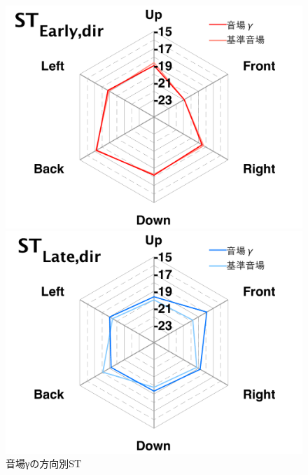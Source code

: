 \documentclass[11pt,a4j]{jreport}
\begin{document}

\newpage


\begin{figure}[H]
  \begin{minipage}[b]{.5\linewidth}
    \centering
    \includegraphics[width=1\linewidth]{images/experimentField/withLegend/03gammaOnBaseEarly.pdf}
  \end{minipage}%
  \begin{minipage}[b]{.5\linewidth}
      \centering
      \includegraphics[width=1\linewidth]{images/experimentField/withLegend/07gammaOnBaseLate.pdf}
  \end{minipage}
  \caption{音場γの方向別ST}
  \label{fig:音場γの方向別ST}
\end{figure}
\end{document}
